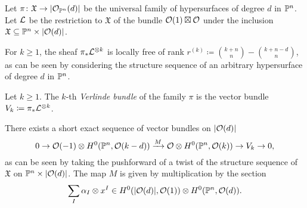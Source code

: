 
\begin{definition}
Let $\pi\colon \mathfrak{X} \to \lvert\mathcal{O}_{\mathbb{P}^n}(d)\rvert$ be the universal family of hypersurfaces of degree $d$ in $\mathbb{P}^n$. Let $\mathcal{L}$ be the restriction to $\mathfrak X$ of the bundle $\mathcal{O}(1)\boxtimes \mathcal{O}$ under the inclusion $\mathfrak{X} \subseteq \mathbb{P}^n \times \lvert\mathcal{O}(d)\rvert$.
\end{definition}

For $k\geq 1$, the sheaf $\pi_{*}\mathcal{L}^{\otimes k}$ is locally free of rank $r^{(k)}\coloneqq \binom{k+n}{n} - \binom{k+n-d}{n}$, as can be seen by considering the structure sequence of an arbitrary hypersurface of degree $d$ in $\mathbb{P}^n$.  


%

\begin{definition}Let $k\geq 1$. The $k$-th \emph{Verlinde bundle} of the family $\pi$ is the vector bundle
$V_k \coloneqq \pi_{*}\mathcal{L}^{\otimes k}$.
\end{definition}

%

There exists a short exact sequence of vector bundles on $\lvert\mathcal{O}(d)\rvert$ 
	\begin{equation} \label{master-verlinde-sequence}
	0\to  \mathcal{O}(-1) \otimes H^0(\mathbb{P}^n, \mathcal{O}(k-d)) 
	\xrightarrow{M}  \mathcal{O} \otimes {H^0(\mathbb{P}^n, \mathcal{O}(k))   }
	\to{V_k}
	\to 0,
	\end{equation}
as can be seen by taking the pushforward of a twist of the structure sequence of $\mathfrak X$ on $\mathbb{P}^n \times \lvert\mathcal{O}(d)\rvert$.
	The map $M$ is given by multiplication by the section
	$$\sum_I \alpha_I \otimes x^I \in
	H^0(\lvert\mathcal{O}(d)\rvert,\mathcal{O}(1)) \otimes H^0(\mathbb{P}^n,\mathcal{O}(d)).$$

